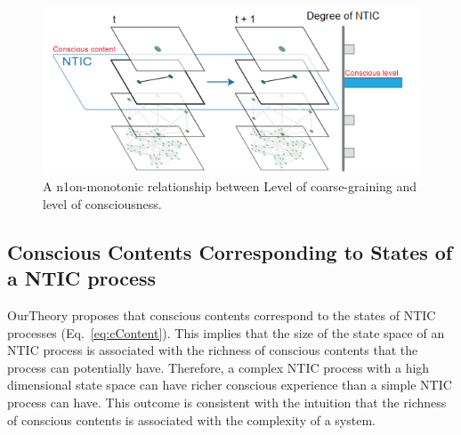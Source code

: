 \documentclass[utf8]{article}
\begin{document}
    		\begin{figure}[H]				
        		\includegraphics[width=\textwidth]{WritingMaterials/Fig_temp/FoxitReader_2019-01-31_19-03-59.png}
        		\caption{A n1on-monotonic relationship between Level of coarse-graining and level of consciousness.}
        		\label{fig:LevelOfConsciousness}
    		\end{figure}
            
            
    	   
            	   
    			
		\subsection{Conscious Contents Corresponding to States of a NTIC process}\label{sec:cc}
    		\ac{OurTheory} proposes that conscious contents correspond to the states of NTIC processes (Eq.~\ref{eq:cContent}). This implies that the size of the state space of an NTIC process is associated with the richness of conscious contents that the process can potentially have. Therefore, a complex NTIC process with a high dimensional state space can have richer conscious experience than a simple NTIC process can have. This outcome is consistent with the intuition that the richness of conscious contents is associated with the complexity of a system. 
    		
\end{document}
